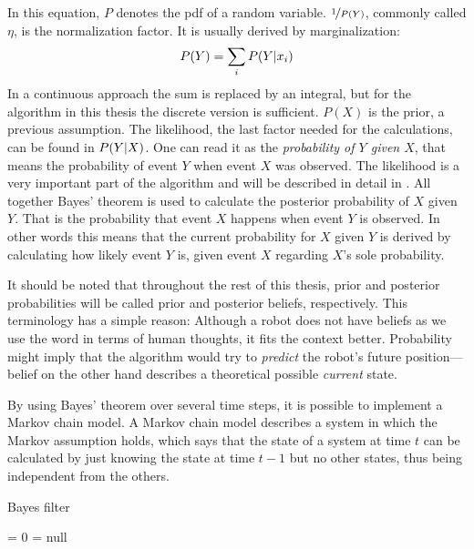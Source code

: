 \documentclass[Thesis.tex]{subfiles}
\begin{document}
In this equation, $P$ denotes the \gls{pdf} of a random variable. $\nicefrac{1}{P(Y)}$, commonly called $\eta$, is the normalization factor. It is usually derived by marginalization: 
\begin{align}
P(Y) = \sum\limits_i \p[P]{Y}{x_i}
\end{align}
In a continuous approach the sum is replaced by an integral, but for the algorithm in this thesis the discrete version is sufficient. $P(X)$ is the prior, a previous assumption.
The likelihood, the last factor needed for the calculations, can be found in $\p[P]{Y}{X}$. One can read it as the \emph{probability of $Y$ given $X$}, that means the probability of event $Y$ when event $X$ was observed. 
The likelihood is a very important part of the algorithm and will be described in detail in . All together Bayes' theorem is used to calculate the posterior probability of $X$ given $Y$. That is the probability that event $X$ happens when event $Y$ is observed. In other words this means that the current probability for $X$ given $Y$ is derived by calculating how likely event $Y$ is, given event $X$ regarding $X$'s sole probability. 

It should be noted that throughout the rest of this thesis, prior and posterior probabilities will be called prior and posterior beliefs, respectively. This terminology has a simple reason: Although a robot does not have beliefs as we use the word in terms of human thoughts, it fits the context better. Probability might imply that the algorithm would try to \emph{predict} the robot's future position---belief on the other hand describes a theoretical possible \emph{current} state.

\bigskip

By using Bayes' theorem over several time steps, it is possible to implement a Markov chain model. A Markov chain model describes a system in which the Markov assumption holds, which says that the state of a system at time $t$ can be calculated by just knowing the state at time $t-1$ but no other states, thus being independent from the others.

\begin{algorithm}
\caption{Bayes filter}
\label{alg:bayesfilter}

\bayesfilter{} {
  \belief = 0\;
  \guess = null\;
}
\end{algorithm}
\end{document}
